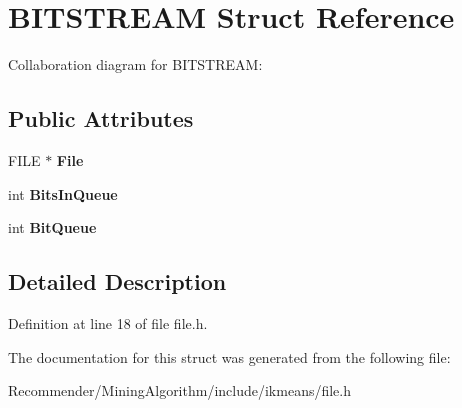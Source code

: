 \section{BITSTREAM Struct Reference}
\label{structBITSTREAM}
Collaboration diagram for BITSTREAM:\subsection*{Public Attributes}
\begin{CompactItemize}
\item 
FILE $\ast$ {\bf File}\label{structBITSTREAM_3b9e4aaf37ed26879e791c42d6abf49b}

\item 
int {\bf BitsInQueue}\label{structBITSTREAM_1ec038c652e28596b0dd06c352820eb8}

\item 
int {\bf BitQueue}\label{structBITSTREAM_54a97f44b5f2f94024bdccc10f92a8cc}

\end{CompactItemize}


\subsection{Detailed Description}




Definition at line 18 of file file.h.

The documentation for this struct was generated from the following file:\begin{CompactItemize}
\item 
Recommender/MiningAlgorithm/include/ikmeans/file.h\end{CompactItemize}
